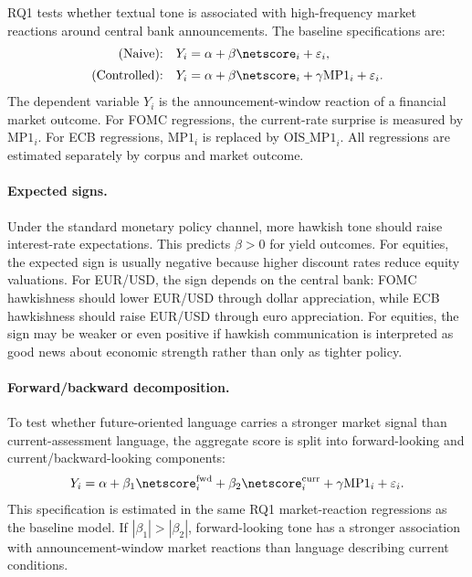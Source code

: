 RQ1 tests whether textual tone is associated with high-frequency market
reactions around central bank announcements. The baseline specifications are:
%
\begin{align}
\text{(Naive):}\quad
Y_i &= \alpha + \beta \netscore_i + \varepsilon_i,
   \label{eq:naive}\\[2pt]
\text{(Controlled):}\quad
Y_i &= \alpha + \beta \netscore_i
    + \gamma \text{MP1}_i + \varepsilon_i.
   \label{eq:controlled}
\end{align}
%
The dependent variable \(Y_i\) is the announcement-window reaction of a
financial market outcome. For FOMC regressions, the current-rate surprise is
measured by \(\text{MP1}_i\). For ECB regressions, \(\text{MP1}_i\) is replaced
by \(\text{OIS\_MP1}_i\). All regressions are estimated separately by corpus and
market outcome.

\paragraph{Expected signs.}
Under the standard monetary policy channel, more hawkish tone should raise
interest-rate expectations. This predicts \(\beta > 0\) for yield outcomes.
For equities, the expected sign is usually negative because higher discount
rates reduce equity valuations. For EUR/USD, the sign depends on the central
bank: FOMC hawkishness should lower EUR/USD through dollar appreciation, while
ECB hawkishness should raise EUR/USD through euro appreciation. For equities,
the sign may be weaker or even positive if hawkish communication is interpreted
as good news about economic strength rather than only as tighter policy.

\paragraph{Forward/backward decomposition.}
To test whether future-oriented language carries a stronger market signal than
current-assessment language, the aggregate score is split into forward-looking
and current/backward-looking components:
%
\begin{equation}
\label{eq:fwd_bwd}
Y_i = \alpha
  + \beta_1 \netscore^{\text{fwd}}_i
  + \beta_2 \netscore^{\text{curr}}_i
  + \gamma \text{MP1}_i
  + \varepsilon_i .
\end{equation}
%
This specification is estimated in the same RQ1 market-reaction regressions as
the baseline model. If \(|\beta_1| > |\beta_2|\), forward-looking tone has a
stronger association with announcement-window market reactions than language
describing current conditions.

